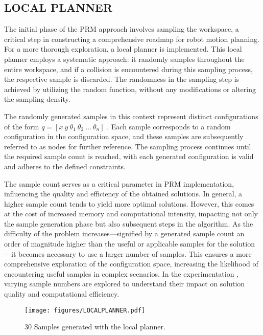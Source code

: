 \documentclass{IEEEtaes}
\begin{document}

\subsection{\fontsize{10}{13}\selectfont LOCAL PLANNER}
The initial phase of the PRM approach involves sampling the workspace, a critical step in constructing a comprehensive roadmap for robot motion planning. For a more thorough exploration, a local planner is implemented. This local planner employs a systematic approach: it randomly samples throughout the entire workspace, and if a collision is encountered during this sampling process, the respective sample is discarded. The randomness in the sampling step is achieved by utilizing the random function, without any modifications or altering the sampling density.

The randomly generated samples in this context represent distinct configurations of the form $q = [ x \ y \ \theta_1 \ \theta_2 \ ... \ \theta_n ]$ . Each sample corresponds to a random configuration in the configuration space, and these samples are subsequently referred to as nodes for further reference. The sampling process continues until the required sample count is reached, with each generated configuration is valid and adheres to the defined constraints. 

The sample count serves as a critical parameter in PRM implementation, influencing the quality and efficiency of the obtained solutions. In general, a higher sample count tends to yield more optimal solutions. However, this comes at the cost of increased memory and computational intensity, impacting not only the sample generation phase but also subsequent steps in the algorithm. As the difficulty of the problem increases—signified by a generated sample count an order of magnitude higher than the useful or applicable samples for the solution—it becomes necessary to use a larger number of samples. This ensures a more comprehensive exploration of the configuration space, increasing the likelihood of encountering useful samples in complex scenarios. In the experimentation , varying sample numbers are explored to understand their impact on solution quality and computational efficiency.

\begin{figure}[t]
    \begin{center}
        \texttt{[image: figures/LOCALPLANNER.pdf]}
     \end{center}
     \vspace{-1.5em}
     \caption{30 Samples generated with the local planner.}
     \label{samples}
     \vspace{-1em}
\end{figure}
\end{document}
